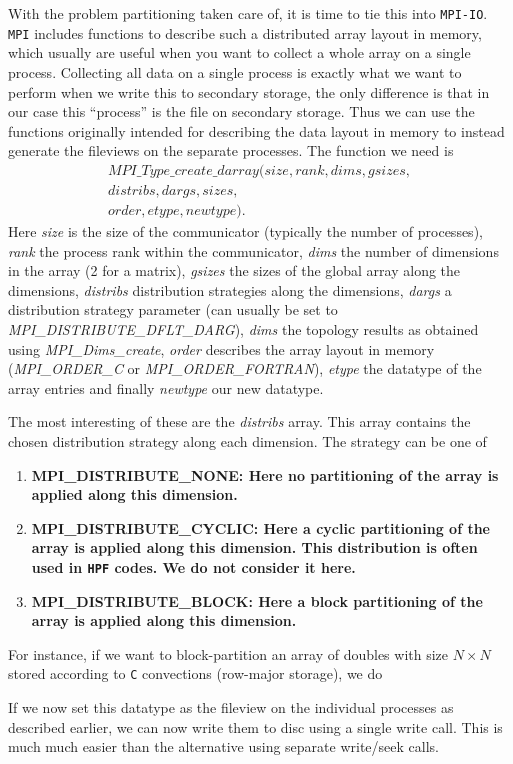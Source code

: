 \documentclass[twoside, 11pt, a4paper]{article}
\begin{document}
With the problem partitioning taken care of, it is time to tie this into \texttt{MPI-IO}.
\texttt{MPI} includes functions to describe such a distributed array layout in memory,
which usually are useful when you want to collect a whole array on a single process.
Collecting all data on a single process is exactly what we want to perform when
we write this to secondary storage, the only difference is that in our case this
``process'' is the file on secondary storage. Thus we can use the functions originally
intended for describing the data layout in memory to instead generate the fileviews
on the separate processes. The function we need is
\[
	\begin{split}
		MPI\_Type\_create\_darray(size,rank,dims,gsizes, \\
								  distribs,dargs,sizes, \\
								  order,etype,newtype).
	\end{split}
\]
Here \emph{size} is the size of the communicator (typically the number of processes),
\emph{rank} the process rank within the communicator, \emph{dims} the number of
dimensions in the array (2 for a matrix), \emph{gsizes} the sizes of the global array
along the dimensions, \emph{distribs} distribution strategies along the dimensions,
\emph{dargs} a distribution strategy parameter (can usually be set to \emph{MPI\_DISTRIBUTE\_DFLT\_DARG}), 
\emph{dims} the topology results as obtained using \emph{MPI\_Dims\_create},
\emph{order} describes the array layout in memory (\emph{MPI\_ORDER\_C} or
\emph{MPI\_ORDER\_FORTRAN}), \emph{etype}
the datatype of the array entries and finally \emph{newtype} our new datatype.

The most interesting of these are the \emph{distribs} array. This array contains
the chosen distribution strategy along each dimension. The strategy can be one of
\begin{enumerate}
	\renewcommand{\theenumi}{$\bullet$}
	\renewcommand{\labelenumi}{\theenumi}
	\item \bf MPI\_DISTRIBUTE\_NONE: \rm  Here no partitioning of the array is applied along 
	this dimension.
	\item \bf MPI\_DISTRIBUTE\_CYCLIC: \rm Here a cyclic partitioning of the array is applied
	along this dimension.
	This distribution is often used in \texttt{HPF} codes. We do not consider it here.
	\item \bf MPI\_DISTRIBUTE\_BLOCK: \rm Here a block partitioning of the array is applied
	along this dimension.
\end{enumerate}
For instance, if we want to block-partition an array of doubles with size $N\times N$
stored according to \texttt{C} convections (row-major storage), we do

If we now set this datatype as the fileview on the individual processes as described
earlier, we can now write them to disc using a single write call. This is much
much easier than the alternative using separate write/seek calls.
\end{document}
